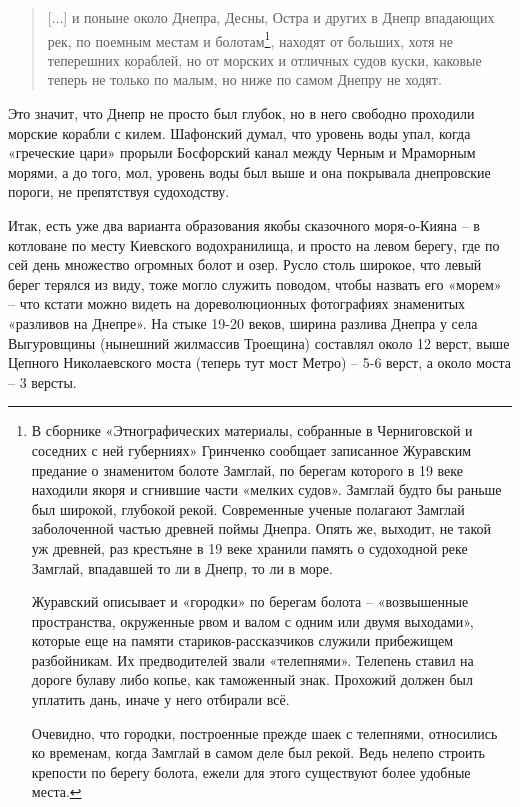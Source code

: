 \begin{quotation}
[...] и поныне около Днепра, Десны, Остра и других в Днепр впадающих рек, по поемным местам и болотам\footnote{В сборнике «Этнографических материалы, собранные в Черниговской и соседних с ней губерниях» Гринченко\cite{grinetnochern} сообщает записанное Журавским предание о знаменитом болоте Замглай, по берегам которого в 19 веке находили якоря и сгнившие части «мелких судов». Замглай будто бы раньше был широкой, глубокой рекой. Современные ученые полагают Замглай заболоченной частью древней поймы Днепра. Опять же, выходит, не такой уж древней, раз крестьяне в 19 веке хранили память о судоходной реке Замглай, впадавшей то ли в Днепр, то ли в море.

Журавский описывает и «городки» по берегам болота – «возвышенные пространства, окруженные рвом и валом с одним или двумя выходами», которые еще на памяти стариков-рассказчиков служили прибежищем разбойникам. Их предводителей звали «телепнями». Телепень ставил на дороге булаву либо копье, как таможенный знак. Прохожий должен был уплатить дань, иначе у него отбирали всё.

Очевидно, что городки, построенные прежде шаек с телепнями, относились ко временам, когда Замглай в самом деле был рекой. Ведь нелепо строить крепости по берегу болота, ежели для этого существуют более удобные места.}, находят от больших, хотя не теперешних кораблей, но от морских и отличных судов куски, каковые теперь не только по малым, но ниже по самом Днепру не ходят.
\end{quotation}

Это значит, что Днепр не просто был глубок, но в него свободно проходили морские корабли с килем. Шафонский думал, что уровень воды упал, когда «греческие цари» прорыли Босфорский канал между Черным и Мраморным морями, а до того, мол, уровень воды был выше и она покрывала днепровские пороги, не препятствуя судоходству.

Итак, есть уже два варианта образования якобы сказочного моря-о-Кияна – в котловане по месту Киевского водохранилища, и просто на левом берегу, где по сей день множество огромных болот и озер. Русло столь широкое, что левый берег терялся из виду, тоже могло служить поводом, чтобы назвать его «морем» – что кстати можно видеть на дореволюционных фотографиях знаменитых «разливов на Днепре». На стыке 19-20 веков, ширина разлива Днепра у села Выгуровщины (нынешний жилмассив Троещина) составлял около 12 верст, выше Цепного Николаевского моста (теперь тут мост Метро) – 5-6 верст, а около моста – 3 версты.

